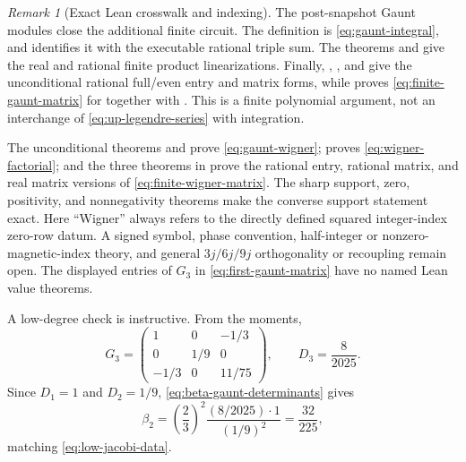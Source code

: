 \documentclass[11pt,oneside]{article}
\theoremstyle{definition}
\theoremstyle{remark}
\newtheorem{remark}[theorem]{Remark}
\numberwithin{equation}{section}
\begin{document}
\begin{remark}[Exact Lean crosswalk and indexing]
The post-snapshot Gaunt modules close the additional finite circuit.  The definition
 is \eqref{eq:gaunt-integral}, and
 identifies it with the executable rational triple sum.
The theorems  and
 give the real and rational finite product
linearizations.  Finally,
,
, and
 give the unconditional rational
full/even entry and matrix forms, while
 proves
\eqref{eq:finite-gaunt-matrix} for  together with
.  This is a finite polynomial argument, not an interchange of
\eqref{eq:up-legendre-series} with integration.

The unconditional theorems
 and
 prove
\eqref{eq:gaunt-wigner};
 proves
\eqref{eq:wigner-factorial}; and the three theorems in
 prove the rational entry, rational
matrix, and real matrix versions of \eqref{eq:finite-wigner-matrix}.  The sharp
support, zero, positivity, and nonnegativity theorems make the converse support
statement exact.  Here ``Wigner'' always refers to the directly defined squared
integer-index zero-row datum.  A signed symbol, phase convention, half-integer or
nonzero-magnetic-index theory, and general \(3j/6j/9j\) orthogonality or
recoupling remain open.  The displayed
entries of \(G_3\) in \eqref{eq:first-gaunt-matrix} have no named Lean value theorems.
\end{remark}

A low-degree check is instructive.  From the moments,
\begin{equation}
 G_3=
 \begin{pmatrix}
 1&0&-1/3\\
 0&1/9&0\\
 -1/3&0&11/75
 \end{pmatrix},
 \qquad
 D_3=\frac8{2025}.
 \label{eq:first-gaunt-matrix}
\end{equation}
Since $D_1=1$ and $D_2=1/9$, \cref{eq:beta-gaunt-determinants} gives
\begin{equation}
 \beta_2=\left(\frac23\right)^2
 \frac{(8/2025)\cdot1}{(1/9)^2}=\frac{32}{225},
 \label{eq:gaunt-beta-check}
\end{equation}
matching \cref{eq:low-jacobi-data}.
\end{document}
